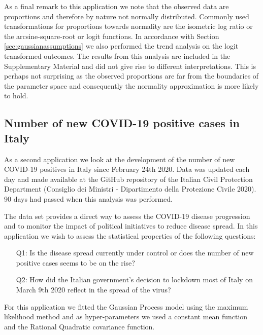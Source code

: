 \documentclass[
  11pt,
]{article}
\theoremstyle{nonumberplain}
\begin{document}
As a final remark to this application we note that the observed data are
proportions and therefore by nature not normally distributed. Commonly
used transformations for proportions towards normality are the isometric
log ratio or the arcsine-square-root or logit functions. In accordance
with Section \ref{sec:gaussianassumptions} we also performed the trend
analysis on the logit transformed outcomes. The results from this
analysis are included in the Supplementary Material and did not give
rise to different interpretations. This is perhaps not surprising as the
observed proportions are far from the boundaries of the parameter space
and consequently the normality approximation is more likely to hold.

\hypertarget{number-of-new-covid-19-positive-cases-in-italy}{%
\subsection*{Number of new COVID-19 positive cases in
Italy}\label{number-of-new-covid-19-positive-cases-in-italy}}

As a second application we look at the development of the number of new
COVID-19 positives in Italy since February 24th 2020. Data was updated
each day and made available at the GitHub repository of the Italian
Civil Protection Department (Consiglio dei Ministri - Dipartimento della
Protezione Civile 2020). 90 days had passed when this analysis was
performed.

The data set provides a direct way to assess the COVID-19 disease
progression and to monitor the impact of political initiatives to reduce
disease spread. In this application we wish to assess the statistical
properties of the following questions:

\begin{itemize}
\item[Q1:]{Is the disease spread currently under control or does the number of new positive cases seems to be on the rise?}
\item[Q2:]{How did the Italian government's decision to lockdown most of Italy on March 9th 2020 reflect in the spread of the virus?}
\end{itemize}

For this application we fitted the Gaussian Process model using the
maximum likelihood method and as hyper-parameters we used a constant
mean function and the Rational Quadratic covariance function.
\end{document}

